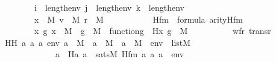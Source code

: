 \begin{isabellebody}
\ \ \ \ \ \ \ \ \ \ {\isachardoublequoteopen}i\ {\isacharless}{\kern0pt}\ length{\isacharparenleft}{\kern0pt}env{\isacharparenright}{\kern0pt}{\isachardoublequoteclose}\ {\isachardoublequoteopen}j\ {\isacharless}{\kern0pt}\ length{\isacharparenleft}{\kern0pt}env{\isacharparenright}{\kern0pt}{\isachardoublequoteclose}\ {\isachardoublequoteopen}k\ {\isacharless}{\kern0pt}\ length{\isacharparenleft}{\kern0pt}env{\isacharparenright}{\kern0pt}{\isachardoublequoteclose}\ \isanewline
\ \ \ \ \ \ \ \ \ \ {\isachardoublequoteopen}x\ {\isasymin}\ M{\isachardoublequoteclose}\ {\isachardoublequoteopen}v\ {\isasymin}\ M{\isachardoublequoteclose}\ {\isachardoublequoteopen}r\ {\isasymin}\ M{\isachardoublequoteclose}\ \isanewline
\ \ \ \ \ \ \ \ \ \ {\isachardoublequoteopen}Hfm\ {\isasymin}\ formula{\isachardoublequoteclose}\ {\isachardoublequoteopen}arity{\isacharparenleft}{\kern0pt}Hfm{\isacharparenright}{\kern0pt}\ {\isasymle}\ {}{\isachardoublequoteclose}\isanewline
\ \ \ \ \ \ \ \ \ \ {\isachardoublequoteopen}{\isacharparenleft}{\kern0pt}{\isasymAnd}x\ g{\isachardot}{\kern0pt}\ x\ {\isasymin}\ M\ {\isasymLongrightarrow}\ g\ {\isasymin}\ M\ {\isasymLongrightarrow}\ function{\isacharparenleft}{\kern0pt}g{\isacharparenright}{\kern0pt}\ {\isasymLongrightarrow}\ H{\isacharparenleft}{\kern0pt}x{\isacharcomma}{\kern0pt}\ g{\isacharparenright}{\kern0pt}\ {\isasymin}\ M{\isacharparenright}{\kern0pt}{\isachardoublequoteclose}\isanewline
\ \ \ \ \ \ \ \ \ \ {\isachardoublequoteopen}wf{\isacharparenleft}{\kern0pt}r{\isacharparenright}{\kern0pt}{\isachardoublequoteclose}\ {\isachardoublequoteopen}trans{\isacharparenleft}{\kern0pt}r{\isacharparenright}{\kern0pt}{\isachardoublequoteclose}\ \isanewline
\ \ \ HH{\isacharcolon}{\kern0pt}\ {\isachardoublequoteopen}{\isacharparenleft}{\kern0pt}{\isasymAnd}a{}\ a{}\ a{}\ env{\isachardot}{\kern0pt}\ a{}\ {\isasymin}\ M\ {\isasymLongrightarrow}\ a{}\ {\isasymin}\ M\ {\isasymLongrightarrow}\ a{}\ {\isasymin}\ M\ {\isasymLongrightarrow}\ env\ {\isasymin}\ list{\isacharparenleft}{\kern0pt}M{\isacharparenright}{\kern0pt}\ \isanewline
\ \ \ \ \ \ \ \ \ \ \ \ \ \ {\isasymLongrightarrow}\ a{}\ {\isacharequal}{\kern0pt}\ H{\isacharparenleft}{\kern0pt}a{}{\isacharcomma}{\kern0pt}\ a{}{\isacharparenright}{\kern0pt}\ {\isasymlongleftrightarrow}\ sats{\isacharparenleft}{\kern0pt}M{\isacharcomma}{\kern0pt}\ Hfm{\isacharcomma}{\kern0pt}\ {\isacharbrackleft}{\kern0pt}a{}{\isacharcomma}{\kern0pt}\ a{}{\isacharcomma}{\kern0pt}\ a{}{\isacharbrackright}{\kern0pt}\ {\isacharat}{\kern0pt}\ env{\isacharparenright}{\kern0pt}{\isacharparenright}{\kern0pt}{\isachardoublequoteclose}\isanewline

\end{isabellebody}
